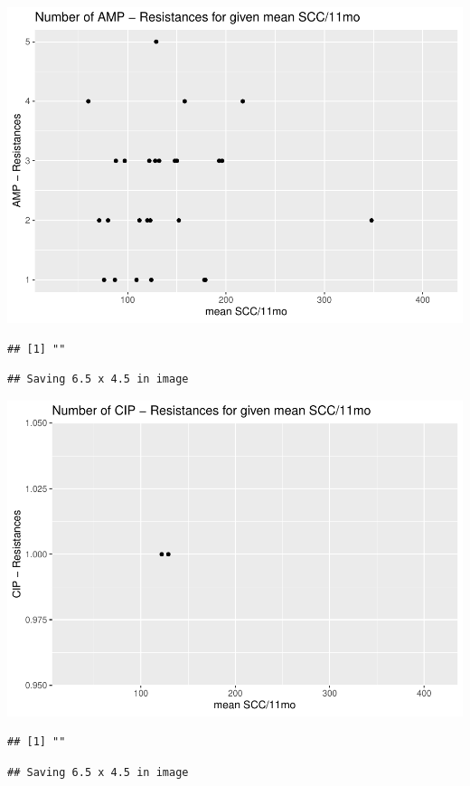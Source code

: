 \documentclass[
]{article}
\begin{document}
\includegraphics{NResistenzen_files/figure-latex/numerical_variables-11.pdf}

\begin{verbatim}
## [1] ""
\end{verbatim}

\begin{verbatim}
## Saving 6.5 x 4.5 in image
\end{verbatim}

\includegraphics{NResistenzen_files/figure-latex/numerical_variables-12.pdf}

\begin{verbatim}
## [1] ""
\end{verbatim}

\begin{verbatim}
## Saving 6.5 x 4.5 in image
\end{verbatim}
\end{document}
